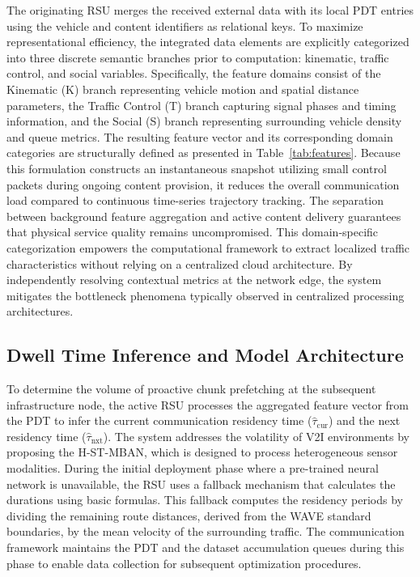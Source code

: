 \documentclass[journal]{IEEEtran}
\begin{document}
The originating RSU merges the received external data with its local PDT entries using the vehicle and content identifiers as relational keys.
To maximize representational efficiency, the integrated data elements are explicitly categorized into three discrete semantic branches prior to computation: kinematic, traffic control, and social variables.
Specifically, the feature domains consist of the Kinematic (K) branch representing vehicle motion and spatial distance parameters, the Traffic Control (T) branch capturing signal phases and timing information, and the Social (S) branch representing surrounding vehicle density and queue metrics.
The resulting feature vector and its corresponding domain categories are structurally defined as presented in Table~\ref{tab:features}.
Because this formulation constructs an instantaneous snapshot utilizing small control packets during ongoing content provision, it reduces the overall communication load compared to continuous time-series trajectory tracking.
The separation between background feature aggregation and active content delivery guarantees that physical service quality remains uncompromised.
This domain-specific categorization empowers the computational framework to extract localized traffic characteristics without relying on a centralized cloud architecture.
By independently resolving contextual metrics at the network edge, the system mitigates the bottleneck phenomena typically observed in centralized processing architectures.

\subsection{Dwell Time Inference and Model Architecture} \label{sec.prop.B}
To determine the volume of proactive chunk prefetching at the subsequent infrastructure node, the active RSU processes the aggregated feature vector from the PDT to infer the current communication residency time ($\hat{\tau}_{\text{cur}}$) and the next residency time ($\hat{\tau}_{\text{nxt}}$).
The system addresses the volatility of V2I environments by proposing the H-ST-MBAN, which is designed to process heterogeneous sensor modalities.
During the initial deployment phase where a pre-trained neural network is unavailable, the RSU uses a fallback mechanism that calculates the durations using basic formulas.
This fallback computes the residency periods by dividing the remaining route distances, derived from the WAVE standard boundaries, by the mean velocity of the surrounding traffic.
The communication framework maintains the PDT and the dataset accumulation queues during this phase to enable data collection for subsequent optimization procedures.
\end{document}
